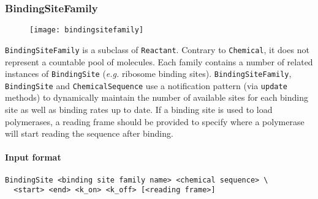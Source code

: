 \subsubsection{BindingSiteFamily}

\begin{figure}[!ht]
	\centering
	\texttt{[image: bindingsitefamily]}
\end{figure}

\texttt{BindingSiteFamily} is a subclass of \texttt{Reactant}. Contrary to \texttt{Chemical}, it does not represent a countable pool of molecules. Each family contains a number of related instances of \texttt{BindingSite} (\textit{e.g.} ribosome binding sites). \texttt{BindingSiteFamily}, \texttt{BindingSite} and \texttt{ChemicalSequence} use a notification pattern (via \texttt{update} methods) to dynamically maintain the number of available sites for each binding site as well as binding rates up to date. If a binding site is used to load polymerases, a reading frame should be provided to specify where a polymerase will start reading the sequence after binding.

\paragraph{Input format}
\begin{verbatim}
BindingSite <binding site family name> <chemical sequence> \
  <start> <end> <k_on> <k_off> [<reading frame>]
\end{verbatim}
